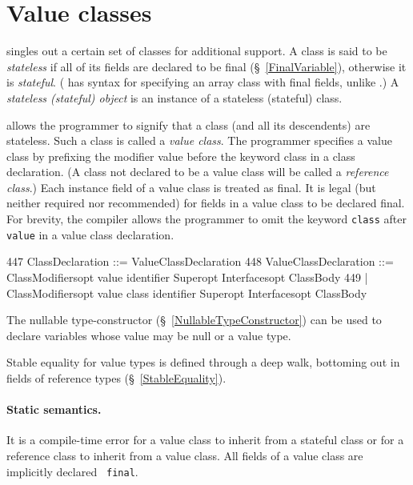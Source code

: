 \section{Value classes}\label{ValueClasses}

{}\Xten{} singles out a certain set of classes for additional
support. A class is said to be {\em stateless} if all of its fields
are declared to be {\cf final} (\S~\ref{FinalVariable}), otherwise it
is {\em stateful}. (\Xten{} has syntax for specifying an array class
with final fields, unlike \java{}.) A {\em stateless (stateful)
object} is an instance of a stateless (stateful) class.

{}\Xten{} allows the programmer to signify that a class (and all its
descendents) are stateless. Such a class is called a {\em value
class}.  The programmer specifies a value class by prefixing the
modifier {\cf value} before the keyword {\cf class} in a class
declaration.  (A class not declared to be a value class will be called
a {\em reference class}.)  Each instance field of a value class is
treated as {\cf final}. It is legal (but neither required nor recommended)
for fields in a value class to be declared final. For brevity, the \Xten{}
compiler allows the programmer to omit the keyword {\tt class} after
{\tt  value} in a value class declaration.

\begin{x10}
447  ClassDeclaration ::= ValueClassDeclaration
448  ValueClassDeclaration ::= 
       ClassModifiersopt value identifier Superopt 
          Interfacesopt ClassBody
449  | ClassModifiersopt value class identifier 
          Superopt Interfacesopt ClassBody
\end{x10}

The {\cf nullable} type-constructor (\S~\ref{NullableTypeConstructor}) can
be used to declare variables whose value may be {\cf null} or a value
type.

\cbstart
Stable equality for value types is defined through a deep walk,
bottoming out in fields of reference types (\S~\ref{StableEquality}).
\cbend

\paragraph{Static semantics.}
It is a compile-time error for a value class to inherit from a
stateful class or for a reference class to inherit from a value
class. All fields of a value class are implicitly declared {\tt
final}.

